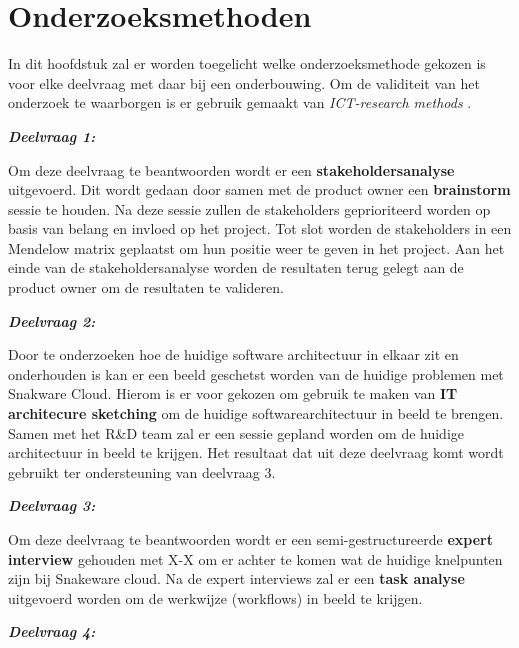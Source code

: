 \section{Onderzoeksmethoden}
In dit hoofdstuk zal er worden toegelicht welke onderzoeksmethode gekozen is voor elke deelvraag met daar bij een onderbouwing.
Om de validiteit van het onderzoek te waarborgen is er gebruik gemaakt van \textit{ICT-research methods} \Parencite{HBO-i-reasearch-methods}.

\whitespace
\textit{\textbf{Deelvraag 1:} \SubquestionOne}

\whitespace
Om deze deelvraag te beantwoorden wordt er een \textbf{stakeholdersanalyse} uitgevoerd.
Dit wordt gedaan door samen met de product owner een \textbf{brainstorm} sessie te houden.
Na deze sessie zullen de stakeholders geprioriteerd worden op basis van belang en invloed op het project.
Tot slot worden de stakeholders in een Mendelow matrix \Parencite{MandelowMatrix} geplaatst om hun positie weer te geven in het project.
Aan het einde van de stakeholdersanalyse worden de resultaten terug gelegt aan de product owner om de resultaten te valideren.

\whitespace
\textit{\textbf{Deelvraag 2:} \SubquestionTwo}

\whitespace
Door te onderzoeken hoe de huidige software architectuur in elkaar zit en onderhouden is kan er een beeld geschetst worden van de huidige problemen met Snakware Cloud.
Hierom is er voor gekozen om gebruik te maken van \textbf{IT architecure sketching} om de huidige softwarearchitectuur in beeld te brengen.
Samen met het R\&D team zal er een sessie gepland worden om de huidige architectuur in beeld te krijgen.
Het resultaat dat uit deze deelvraag komt wordt gebruikt ter ondersteuning van deelvraag 3.

\whitespace
\textit{\textbf{Deelvraag 3:} \SubquestionThree}

\whitespace
Om deze deelvraag te beantwoorden wordt er een semi-gestructureerde \textbf{expert interview} gehouden met X-X om er achter te komen wat de huidige knelpunten zijn bij Snakeware cloud.
Na de expert interviews zal er een \textbf{task analyse} uitgevoerd worden om de werkwijze (workflows) in beeld te krijgen.


\whitespace
\textit{\textbf{Deelvraag 4:} \SubquestionFour}

